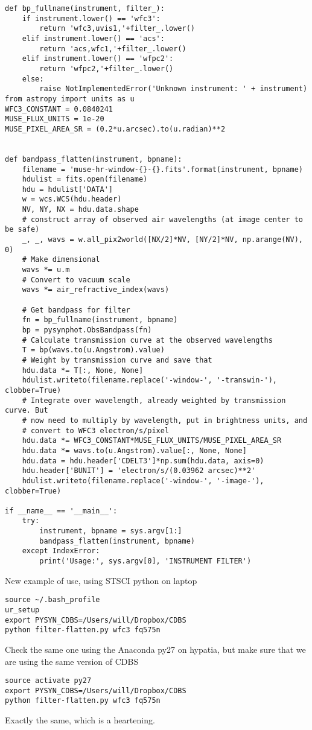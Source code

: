 \documentclass[11pt]{article}
\begin{document}
\begin{enumerate}
\begin{verbatim}
def bp_fullname(instrument, filter_):
    if instrument.lower() == 'wfc3':
        return 'wfc3,uvis1,'+filter_.lower()
    elif instrument.lower() == 'acs':
        return 'acs,wfc1,'+filter_.lower()
    elif instrument.lower() == 'wfpc2':
        return 'wfpc2,'+filter_.lower()
    else:
        raise NotImplementedError('Unknown instrument: ' + instrument)
from astropy import units as u
WFC3_CONSTANT = 0.0840241
MUSE_FLUX_UNITS = 1e-20 
MUSE_PIXEL_AREA_SR = (0.2*u.arcsec).to(u.radian)**2


def bandpass_flatten(instrument, bpname):
    filename = 'muse-hr-window-{}-{}.fits'.format(instrument, bpname)
    hdulist = fits.open(filename)
    hdu = hdulist['DATA']
    w = wcs.WCS(hdu.header)
    NV, NY, NX = hdu.data.shape
    # construct array of observed air wavelengths (at image center to be safe)
    _, _, wavs = w.all_pix2world([NX/2]*NV, [NY/2]*NV, np.arange(NV), 0) 
    # Make dimensional
    wavs *= u.m
    # Convert to vacuum scale
    wavs *= air_refractive_index(wavs)

    # Get bandpass for filter
    fn = bp_fullname(instrument, bpname)
    bp = pysynphot.ObsBandpass(fn)
    # Calculate transmission curve at the observed wavelengths
    T = bp(wavs.to(u.Angstrom).value)
    # Weight by transmission curve and save that
    hdu.data *= T[:, None, None]
    hdulist.writeto(filename.replace('-window-', '-transwin-'), clobber=True)
    # Integrate over wavelength, already weighted by transmission curve. But
    # now need to multiply by wavelength, put in brightness units, and
    # convert to WFC3 electron/s/pixel
    hdu.data *= WFC3_CONSTANT*MUSE_FLUX_UNITS/MUSE_PIXEL_AREA_SR
    hdu.data *= wavs.to(u.Angstrom).value[:, None, None]
    hdu.data = hdu.header['CDELT3']*np.sum(hdu.data, axis=0)
    hdu.header['BUNIT'] = 'electron/s/(0.03962 arcsec)**2'
    hdulist.writeto(filename.replace('-window-', '-image-'), clobber=True)

if __name__ == '__main__':
    try:
        instrument, bpname = sys.argv[1:]
        bandpass_flatten(instrument, bpname)
    except IndexError:
        print('Usage:', sys.argv[0], 'INSTRUMENT FILTER')
\end{verbatim}

New example of use, using STSCI python on laptop
\begin{verbatim}
source ~/.bash_profile
ur_setup
export PYSYN_CDBS=/Users/will/Dropbox/CDBS
python filter-flatten.py wfc3 fq575n
\end{verbatim}


Check the same one using the Anaconda py27 on hypatia, but make sure that we are using the same version of CDBS
\begin{verbatim}
source activate py27
export PYSYN_CDBS=/Users/will/Dropbox/CDBS
python filter-flatten.py wfc3 fq575n
\end{verbatim}
Exactly the same, which is a heartening.  


\end{enumerate}
\end{document}
